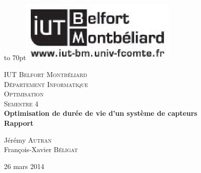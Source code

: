 \documentclass[12pt]{report}
\begin{document}
{
\begin{titlepage}

\vbox to 70pt{\hfill\includegraphics[height=3cm]{images/logo-iut.eps}}\
\begin{center}

\textsc{\LARGE IUT Belfort Montbéliard}\\[0.7cm]
\textsc{\LARGE Département Informatique}\\[1.0cm]
\textsc{\Large Optimisation}\\[0.5cm]
\textsc{\Large Semestre 4}\\[5cm]


{ \huge \bfseries Optimisation de durée de vie d'un système de capteurs}\\[0.5cm]
{ \huge \bfseries Rapport}\\[3cm]

\begin{large}
Jérémy \textsc{Autran}\\[0.3em]
François-Xavier \textsc{Béligat}\\[0.3em]

\end{large}

\vfill

{\large 26 mars 2014}

\end{center}
\end{titlepage}
}

{\clearpage\mbox{}\thispagestyle{empty}\clearpage}
\setcounter{page}{1}






\end{document}
